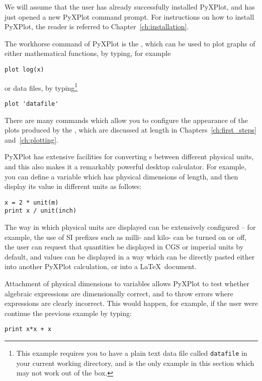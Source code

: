 We will assume that the user has already successfully installed PyXPlot, and
has just opened a new PyXPlot command prompt. For instructions on how to
install PyXPlot, the reader is referred to Chapter~\ref{ch:installation}.

The workhorse command of PyXPlot is the , which can be used to
plot graphs of either mathematical functions, by typing, for example

\begin{verbatim}
plot log(x)
\end{verbatim}

\noindent or data files, by typing\footnote{This example requires you to have a
plain text data file called {\tt datafile} in your current working directory,
and is the only example in this section which may not work out of the box.}

\begin{verbatim}
plot 'datafile'
\end{verbatim}

\noindent There are many commands which allow you to configure the appearance
of the plots produced by the , which are discussed at length in
Chapters~\ref{ch:first_steps} and~\ref{ch:plotting}.

PyXPlot has extensive facilities for converting \datafile s between different
physical units, and this also makes it a remarkably powerful desktop
calculator. For example, you can define a variable which has physical
dimensions of length, and then display its value in different units as follows:

\begin{verbatim}
x = 2 * unit(m)
print x / unit(inch)
\end{verbatim}

\noindent The way in which physical units are displayed can be extensively
configured -- for example, the use of SI prefixes such as milli- and kilo- can
be turned on or off, the user can request that quantities be displayed in CGS
or imperial units by default, and values can be displayed in a way which can be
directly pasted either into another PyXPlot calculation, or into a \LaTeX\
document.

Attachment of physical dimensions to variables allows PyXPlot to test whether
algebraic expressions are dimensionally correct, and to throw errors where
expressions are clearly incorrect. This would happen, for example, if the user
were continue the previous example by typing:

\begin{verbatim}
print x*x + x
\end{verbatim}

